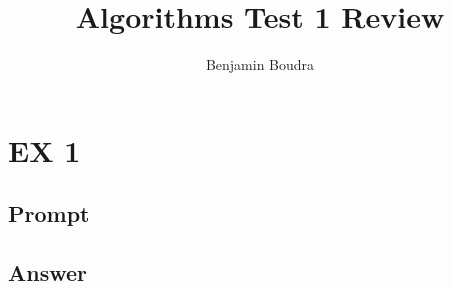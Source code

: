 \documentclass[10pt,a4paper]{article}
\title{Algorithms Test 1 Review}
\author{Benjamin Boudra}
\begin{document}
\maketitle
\tableofcontents
\section{EX 1}
\subsection{Prompt}
\subsection{Answer}
\end{document}
